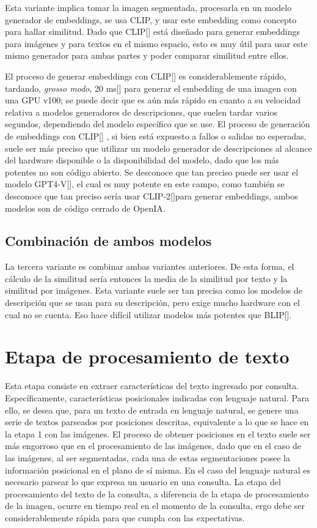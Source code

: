 Esta variante implica tomar la imagen segmentada, procesarla en un modelo generador de embeddings, se usa CLIP, y usar este embedding como concepto para hallar similitud. Dado que CLIP[\cite{clip}] está diseñado para generar embeddings para imágenes y para textos en el mismo espacio, esto es muy útil para usar este mismo generador para ambas partes y poder comparar similitud entre ellos.

El proceso de generar embeddings con CLIP[\cite{clip}] es considerablemente rápido, tardando, \textit{grosso modo}, 20 ms[\cite{BuildingImageClip-20ms}] para generar el embedding de una imagen con una GPU v100; se puede decir que es aún más rápido en cuanto a su velocidad relativa a modelos generadores de descripciones, que suelen tardar varios segundos, dependiendo del modelo específico que se use. El proceso de generación de embeddings con CLIP[\cite{clip}] , si bien est\'a expuesto a fallos o salidas no esperadas, suele ser más preciso que utilizar un modelo generador de descripciones al alcance del hardware disponible o la disponibilidad del modelo, dado que los más potentes no son código abierto. Se desconoce que tan preciso puede ser usar el modelo GPT4-V[\cite{gpt-4v}], el cual es muy potente en este campo, como también se desconoce que tan preciso sería usar CLIP-2[\cite{clip2-paper}]para generar embeddings, ambos modelos son de código cerrado de OpenIA.

\subsection{Combinaci\'on de ambos modelos}
La tercera variante es combinar ambas variantes anteriores. De esta forma, el cálculo de la similitud sería entonces la media de la similitud por texto y la similitud por imágenes. Esta variante suele ser tan precisa como los modelos de descripción que se usan para su descripción, pero exige mucho hardware con el cual no se cuenta. Eso hace dif\'icil utilizar modelos más potentes que BLIP[\cite{blip}].

\section{Etapa de procesamiento de texto}

Esta etapa consiste en extraer características del texto ingresado por consulta. Específicamente, características posicionales indicadas con lenguaje natural. Para ello, se desea que, para un texto de entrada en lenguaje natural, se genere una serie de textos parseados por posiciones descritas, equivalente a lo que se hace en la etapa 1 con las imágenes. El proceso de obtener posiciones en el texto suele ser más engorroso que en el procesamiento de las imágenes, dado que en el caso de las imágenes, al ser segmentadas, cada una de estas segmentaciones posee la información posicional en el plano de sí misma. En el caso del lenguaje natural es necesario parsear lo que expresa un usuario en una consulta. La etapa del procesamiento del texto de la consulta, a diferencia de la etapa de procesamiento de la imagen, ocurre en tiempo real en el momento de la consulta, ergo debe ser considerablemente rápida para que cumpla con las expectativas.

